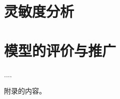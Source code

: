 \documentclass{cumcmthesis}
\begin{document}
\section{灵敏度分析}

\section{模型的评价与推广}

\begin{thebibliography}{99}%

     ....

\end{thebibliography}

\begin{appendices}

    附录的内容。

\end{appendices}
\end{document}
